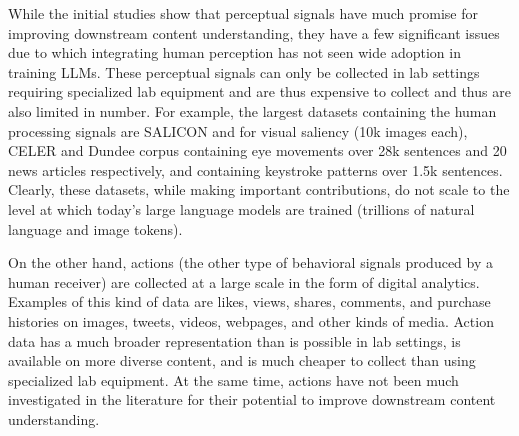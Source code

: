 While the initial studies show that perceptual signals have much promise for improving downstream content understanding, they have a few significant issues due to which integrating human perception has not seen wide adoption in training LLMs. These perceptual signals can only be collected in lab settings requiring specialized lab equipment and are thus expensive to collect and thus are also limited in number. For example, the largest datasets containing the human processing signals are SALICON \cite{jiang2015salicon} and \citet{cheng2014global} for visual saliency (10k images each), CELER \cite{berzak2022celer} and Dundee corpus \cite{kennedy2013frequency}  containing eye movements over 28k sentences and 20 news articles respectively, and \citet{dhakal2018observations} containing keystroke patterns over 1.5k sentences. Clearly, these datasets, while making important contributions, do not scale to the level at which today's large language models are trained (trillions of natural language and image tokens). %


On the other hand, actions (the other type of behavioral signals produced by a human receiver) are collected at a large scale in the form of digital analytics. Examples of this kind of data are likes, views, shares, comments, and purchase histories on images, tweets, videos, webpages, and other kinds of media. Action data has a much broader representation than is possible in lab settings, is available on more diverse content, and is much cheaper to collect than using specialized lab equipment. At the same time, actions have not been much investigated in the literature for their potential to improve downstream content understanding. %


